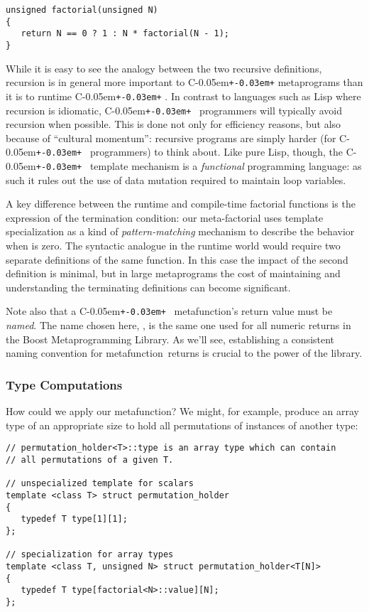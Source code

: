 \documentclass{kapproc}
\newcommand{\Cpp}{C\kern-0.05em\texttt{+\kern-0.03em+}%
}
\newcommand{\Mpl}{Boost Meta\-pro\-gram\-ming Library}
\newcommand{\mfn}{meta\-func\-tion}
\begin{document}
{\small
\begin{codesamp}\begin{verbatim}
unsigned factorial(unsigned N)
{
   return N == 0 ? 1 : N * factorial(N - 1);
}
\end{verbatim}
\end{codesamp}
}

While it is easy to see the analogy between the two recursive
definitions, recursion is in general more important to \Cpp{}
metaprograms than it is to runtime \Cpp. In contrast to languages such
as Lisp where recursion is idiomatic, \Cpp\ programmers will typically
avoid recursion when possible. This is done not only for efficiency
reasons, but also because of ``cultural momentum'': recursive programs
are simply harder (for \Cpp\ programmers) to think about. Like pure
Lisp, though, the \Cpp\ template mechanism is a \emph{functional}
programming language: as such it rules out the use of data mutation
required to maintain loop variables.

A key difference between the runtime and compile-time factorial
functions is the expression of the termination condition: our
meta-factorial uses template specialization as a kind of
\emph{pattern-matching} mechanism to describe the behavior when
 is zero. The syntactic analogue in the runtime world would
require two separate definitions of the same function. In this case
the impact of the second definition is minimal, but in large
metaprograms the cost of maintaining and understanding the terminating
definitions can become significant.

Note also that a \Cpp\ \mfn's return value must be \emph{named}. The
name chosen here, , is the same one used for all numeric
returns in the \Mpl. As we'll see, establishing a consistent naming
convention for \mfn\ returns is crucial to the power of the library.

\subsubsection{Type Computations}

How could we apply our  \mfn{}? We might, for example,
produce an array type of an appropriate size to hold all permutations
of instances of another type:

{\small
\begin{codesamp}\begin{verbatim}
// permutation_holder<T>::type is an array type which can contain 
// all permutations of a given T.

// unspecialized template for scalars
template <class T> struct permutation_holder
{
   typedef T type[1][1];
};

// specialization for array types
template <class T, unsigned N> struct permutation_holder<T[N]>
{
   typedef T type[factorial<N>::value][N];
};
\end{verbatim}
\end{codesamp}
}
\end{document}
